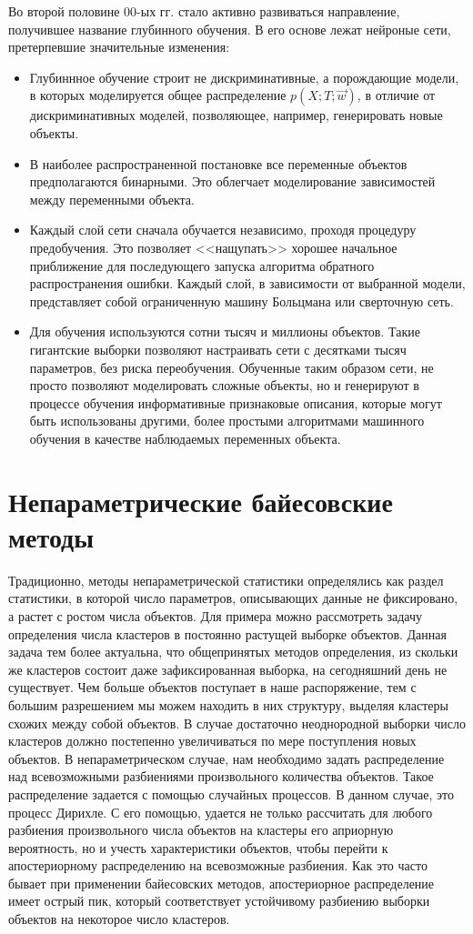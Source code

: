 Во второй половине 00-ых гг. стало активно развиваться направление, получившее название глубинного
обучения. В его основе лежат нейроные сети, претерпевшие значительные изменения:
\begin{itemize}
  \item Глубиннное обучение строит не дискриминативные, а порождающие модели, в которых моделируется
    общее распределение \( p(X;T;\vec{w}) \), в отличие от дискриминативных моделей, позволяющее,
    например, генерировать новые объекты.
  \item В наиболее распространенной постановке все переменные объектов предполагаются бинарными. Это
    облегчает моделирование зависимостей между переменными объекта.
  \item Каждый слой сети сначала обучается независимо, проходя процедуру предобучения. Это позволяет
    <<нащупать>> хорошее начальное приближение для последующего запуска алгоритма обратного распространения
    ошибки. Каждый слой, в зависимости от выбранной модели, представляет собой ограниченную машину
    Больцмана или сверточную сеть.
  \item Для обучения используются сотни тысяч и миллионы объектов. Такие гигантские выборки позволяют
    настраивать сети с десятками тысяч параметров, без риска переобучения. Обученные таким образом сети,
    не просто позволяют моделировать сложные объекты, но и генерируют в процессе обучения информативные
    признаковые описания, которые могут быть использованы другими, более простыми алгоритмами машинного
    обучения в качестве наблюдаемых переменных объекта.
\end{itemize}

\section{Непараметрические байесовские методы}
Традиционно, методы непараметрической статистики определялись как раздел статистики, в которой число
параметров, описывающих данные не фиксировано, а растет с ростом числа объектов.
Для примера можно рассмотреть задачу определения числа кластеров в постоянно растущей выборке объектов.
Данная задача тем более актуальна, что общепринятых методов определения, из скольки же кластеров состоит
даже зафиксированная выборка, на сегодняшний день не существует. Чем больше объектов поступает в наше
распоряжение, тем с большим разрешением мы можем находить в них структуру, выделяя кластеры схожих между
собой объектов. В случае достаточно неоднородной выборки число кластеров должно постепенно увеличиваться
по мере поступления новых объектов. В непараметрическом случае, нам необходимо задать распределение
над всевозможными разбиениями произвольного количества объектов. Такое распределение задается с помощью
случайных процессов. В данном случае, это процесс Дирихле. С его помощью, удается не только рассчитать
для любого разбиения произвольного числа объектов на кластеры его априорную вероятность, но и учесть
характеристики объектов, чтобы перейти к апостериорному распределению на всевозможные разбиения. Как
это часто бывает при применении байесовских методов, апостериорное распределение имеет острый пик,
который соответствует устойчивому разбиению выборки объектов на некоторое число кластеров.

